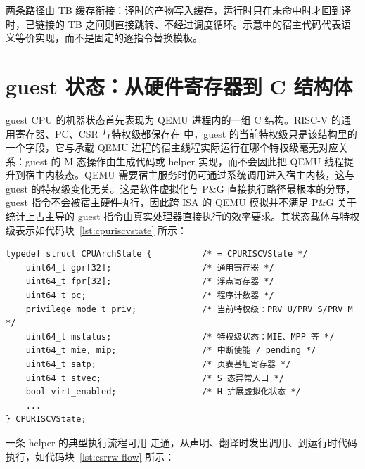 两条路径由 TB 缓存衔接：译时的产物写入缓存，运行时只在未命中时才回到译时，已链接的 TB 之间则直接跳转、不经过调度循环。示意中的宿主代码代表语义等价实现，而不是固定的逐指令替换模板。

\section{guest 状态：从硬件寄存器到 C 结构体}\label{sec:software-cpu-state}

guest CPU 的机器状态首先表现为 QEMU 进程内的一组 C 结构。RISC-V 的通用寄存器、PC、CSR 与特权级都保存在  中，guest 的当前特权级只是该结构里的一个字段，它与承载 QEMU 进程的宿主线程实际运行在哪个特权级毫无对应关系：guest 的 M 态操作由生成代码或 helper 实现，而不会因此把 QEMU 线程提升到宿主内核态。QEMU 需要宿主服务时仍可通过系统调用进入宿主内核，这与 guest 的特权级变化无关。这是软件虚拟化与 P\&G 直接执行路径最根本的分野，guest 指令不会被宿主硬件执行，因此跨 ISA 的 QEMU 模拟并不满足 P\&G 关于统计上占主导的 guest 指令由真实处理器直接执行的效率要求\cite{source1,source3}。其状态载体与特权级表示如代码块~\ref{lst:cpuriscvstate} 所示：

\begin{lstlisting}[caption={RISC-V guest CPU 状态的主要字段（QEMU target/riscv/cpu.h，节选）},label={lst:cpuriscvstate}]
typedef struct CPUArchState {          /* = CPURISCVState */
    uint64_t gpr[32];                  /* 通用寄存器 */
    uint64_t fpr[32];                  /* 浮点寄存器 */
    uint64_t pc;                       /* 程序计数器 */
    privilege_mode_t priv;             /* 当前特权级：PRV_U/PRV_S/PRV_M */
    uint64_t mstatus;                  /* 特权级状态：MIE、MPP 等 */
    uint64_t mie, mip;                 /* 中断使能 / pending */
    uint64_t satp;                     /* 页表基址寄存器 */
    uint64_t stvec;                    /* S 态异常入口 */
    bool virt_enabled;                 /* H 扩展虚拟化状态 */
    ...
} CPURISCVState;
\end{lstlisting}

一条 helper 的典型执行流程可用  走通，从声明、翻译时发出调用、到运行时代码执行，如代码块~\ref{lst:csrrw-flow} 所示：

